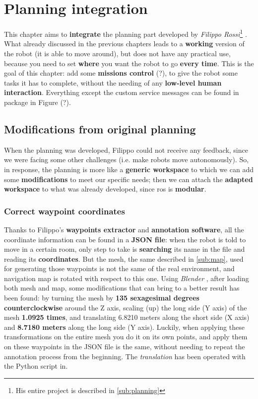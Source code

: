 \chapter{Planning integration}

This chapter aims to \textbf{integrate} the planning part developed by \textit{Filippo Rossi}\footnote{His entire project is described in \autoref{sub:planning}} \cite{fr}. What already discussed in the previous chapters leads to a \textbf{working} version of the robot (it is able to move around), but does not have any practical use, because you need to set \textbf{where} you want the robot to go \textbf{every time}. This is the goal of this chapter: add some \textbf{missions control} (?), to give the robot some tasks it has to complete, without the needing of any \textbf{low-level human interaction}. Everything except the custom service messages can be found in  package in Figure (?).

\section{Modifications from original planning}

When the planning was developed, Filippo could not receive any feedback, since we were facing some other challenges (i.e. make robots move autonomously). So, in response, the planning is more like a \textbf{generic workspace} to which we can add some \textbf{modifications} to meet our specific needs; then we can attach the \textbf{adapted workspace} to what was already developed, since \acrshort{ros} is \textbf{modular}.

\subsection{Correct waypoint coordinates}
\label{sub:waypoints}

Thanks to Filippo's \textbf{waypoints extractor} and  \textbf{annotation software}, all the coordinate information can be found in a \textbf{JSON file}: when the robot is told to move in a certain room, only step to take is \textbf{searching} its name in the file and reading its \textbf{coordinates}.
But the mesh, the same described in \autoref{sub:map}, used for generating those waypoints is not the same of the real environment, and navigation map is rotated with respect to this one.
Using \textit{Blender} \cite{blender}, after loading both mesh and map, some modifications that can bring to a better result has been found: by turning the mesh by \textbf{135 sexagesimal degrees counterclockwise} around the Z axis, scaling (up) the long side (Y axis) of the mesh \textbf{1.0925 times}, and translating 6.8210 meters along the short side (X axis) and \textbf{8.7180 meters} along the long side (Y axis). Luckily, when applying these transformations on the entire mesh you do it on its own points, and apply them on these waypoints in the JSON file is the same, without needing to repeat the annotation process from the beginning. The \textit{translation} has been operated with the Python script in. %

